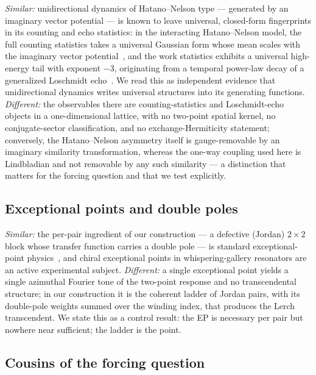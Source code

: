 \documentclass[11pt,a4paper]{article}
\begin{document}
\emph{Similar:} unidirectional dynamics of Hatano--Nelson type --- generated by
an imaginary vector potential --- is known to leave universal, closed-form
fingerprints in its counting and echo statistics: in the interacting
Hatano--Nelson model, the full counting statistics takes a universal Gaussian
form whose mean scales with the imaginary vector
potential~\cite{DoraMoca2022}, and the work statistics exhibits a universal
high-energy tail with exponent $-3$, originating from a temporal power-law
decay of a generalized Loschmidt echo~\cite{DoraMoca2023}. We read this as
independent evidence that unidirectional dynamics writes universal structures
into its generating functions. \emph{Different:} the observables there are
counting-statistics and Loschmidt-echo objects in a one-dimensional lattice,
with no two-point spatial kernel, no conjugate-sector classification, and no
exchange-Hermiticity statement; conversely, the Hatano--Nelson asymmetry
itself is gauge-removable by an imaginary similarity transformation, whereas
the one-way coupling used here is Lindbladian and not removable by any such
similarity --- a distinction that matters for the forcing question and that we
test explicitly.

\subsection{Exceptional points and double poles}

\emph{Similar:} the per-pair ingredient of our construction --- a defective
(Jordan) $2\times 2$ block whose transfer function carries a double pole --- is
standard exceptional-point physics~\cite{Heiss2012}, and chiral exceptional
points in whispering-gallery resonators are an active experimental subject.
\emph{Different:} a single exceptional point yields a single azimuthal Fourier
tone of the two-point response and no transcendental structure; in our
construction it is the coherent ladder of Jordan pairs, with its double-pole
weights summed over the winding index, that produces the Lerch transcendent. We
state this as a control result: the EP is necessary per pair but nowhere near
sufficient; the ladder is the point.

\subsection{Cousins of the forcing question}
\end{document}
